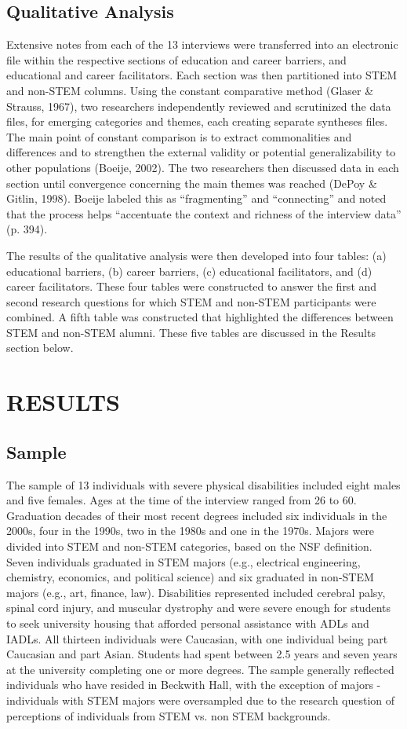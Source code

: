 \documentclass[11.5pt]{sig-alternate} %
\begin{document}
\begin{large}
\subsection*{Qualitative Analysis}
Extensive notes from each of the 13 interviews were transferred into an electronic file within the respective sections of education and career barriers, and educational and career facilitators. Each section was then partitioned into STEM and non-STEM columns. Using the constant comparative method (Glaser \& Strauss, 1967), two researchers independently reviewed and scrutinized the data files, for emerging categories and themes, each creating separate syntheses files. The main point of constant comparison is to extract commonalities and differences and to strengthen the external validity or potential generalizability to other populations (Boeije, 2002). The two researchers then discussed data in each section until convergence concerning the main themes was reached (DePoy \& Gitlin, 1998). Boeije labeled this as “fragmenting” and “connecting” and noted that the process helps “accentuate the context and richness of the interview data” (p. 394).

The results of the qualitative analysis were then developed into four tables: (a) educational barriers, (b) career barriers, (c) educational facilitators, and (d) career facilitators. These four tables were constructed to answer the first and second research questions for which STEM and non-STEM participants were combined. A fifth table was constructed that highlighted the differences between STEM and non-STEM alumni. These five tables are discussed in the Results section below.

\section*{RESULTS}
\subsection*{Sample}
The sample of 13 individuals with severe physical disabilities included eight males and five females. Ages at the time of the interview ranged from 26 to 60. Graduation decades of their most recent degrees included six individuals in the 2000s, four in the 1990s, two in the 1980s and one in the 1970s. Majors were divided into STEM and non-STEM categories, based on the NSF definition. Seven individuals graduated in STEM majors (e.g., electrical engineering, chemistry, economics, and political science) and six graduated in non-STEM majors (e.g., art, finance, law). Disabilities represented included cerebral palsy, spinal cord injury, and muscular dystrophy and were severe enough for students to seek university housing that afforded personal assistance with ADLs and IADLs. All thirteen individuals were Caucasian, with one individual being part Caucasian and part Asian. Students had spent between 2.5 years and seven years at the university completing one or more degrees. The sample generally reflected individuals who have resided in Beckwith Hall, with the exception of majors - individuals with STEM majors were oversampled due to the research question of perceptions of individuals from STEM vs. non STEM backgrounds.


\end{large}
\end{document}
